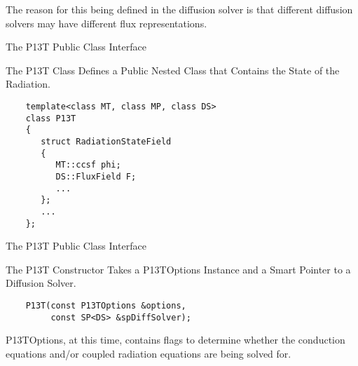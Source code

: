 \documentclass{myslidehead}
\begin{document}

\begin{note}

  The reason for this being defined in the diffusion solver is that
  different diffusion solvers may have different flux representations.

\end{note}


\begin{slide}

  \begin{center}
    \large The P13T Public Class Interface
  \end{center}

  The P13T Class Defines a Public Nested Class
  that Contains the State of the Radiation.

  \begin{verbatim}
    template<class MT, class MP, class DS>
    class P13T
    {
       struct RadiationStateField
       {
          MT::ccsf phi;
          DS::FluxField F;
          ...
       };
       ...
    };
  \end{verbatim}

\end{slide}


\begin{slide}

  \begin{center}
    \large The P13T Public Class Interface
  \end{center}

  The P13T Constructor Takes a P13TOptions Instance and
  a Smart Pointer to a Diffusion Solver.

  \begin{verbatim}
    P13T(const P13TOptions &options, 
         const SP<DS> &spDiffSolver);
  \end{verbatim}

\end{slide}


\begin{note}
  P13TOptions, at this time, contains flags to determine whether
  the conduction equations and/or coupled radiation equations are being
  solved for.
\end{note}
\end{document}
